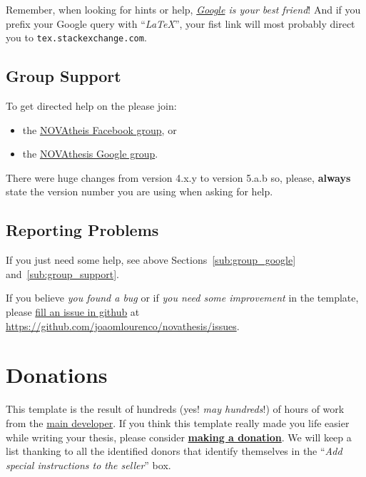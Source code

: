 Remember, when looking for hints or help, \emph{\href{google.com}{Google} is your best friend}!   And if you prefix your Google query with “\emph{LaTeX}”, your fist link will most probably direct you to \texttt{tex.stackexchange.com}.

\subsection{Group Support}
\label{sub:group_support}

To get directed help on the  please join:
\begin{itemize}
  \item the \href{https://www.facebook.com/groups/novathesis}{NOVAtheis Facebook group}, or
  \item the \href{https://groups.google.com/forum/#!forum/novathesis}{NOVAthesis Google group}.
\end{itemize}

There were huge changes from version 4.x.y to version 5.a.b so, please, \textbf{always} state the version number you are using when asking for help.

\subsection{Reporting Problems}
\label{sub:reporting_problems}

If you just need some help, see above Sections~\autoref{sub:group_google} and~\autoref{sub:group_support}.

If you believe \emph{you found a bug} or if \emph{you need some improvement} in the template, please \href{https://github.com/joaomlourenco/novathesis/issues}{fill an issue in github} at \url{https://github.com/joaomlourenco/novathesis/issues}.


\section{Donations}
\label{sec:donations}

This template is the result of hundreds (yes! \emph{may hundreds}!) of hours of work from the \href{https://docentes.fct.unl.pt/joao-lourenco}{main developer}.  If you think this template really made you life easier while writing your thesis, please consider \href{https://paypal.me/novathesis}{\textbf{making a donation}}. We will keep a list thanking to all the identified donors that identify themselves in the “\emph{Add special instructions to the seller}” box.

